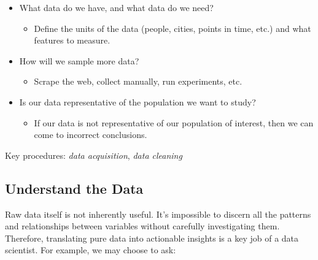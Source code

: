 \documentclass[
  letterpaper,
  DIV=11,
  numbers=noendperiod]{scrreprt}
\providecommand{\tightlist}{%
  \setlength{\itemsep}{0pt}\setlength{\parskip}{0pt}}\usepackage{longtable,booktabs,array}
\begin{document}
\begin{itemize}
\tightlist
\item
  What data do we have, and what data do we need?

  \begin{itemize}
  \tightlist
  \item
    Define the units of the data (people, cities, points in time, etc.)
    and what features to measure.
  \end{itemize}
\item
  How will we sample more data?

  \begin{itemize}
  \tightlist
  \item
    Scrape the web, collect manually, run experiments, etc.
  \end{itemize}
\item
  Is our data representative of the population we want to study?

  \begin{itemize}
  \tightlist
  \item
    If our data is not representative of our population of interest,
    then we can come to incorrect conclusions.
  \end{itemize}
\end{itemize}

Key procedures: \emph{data acquisition}, \emph{data cleaning}

\hypertarget{understand-the-data}{%
\subsection{Understand the Data}\label{understand-the-data}}

Raw data itself is not inherently useful. It's impossible to discern all
the patterns and relationships between variables without carefully
investigating them. Therefore, translating pure data into actionable
insights is a key job of a data scientist. For example, we may choose to
ask:
\end{document}

